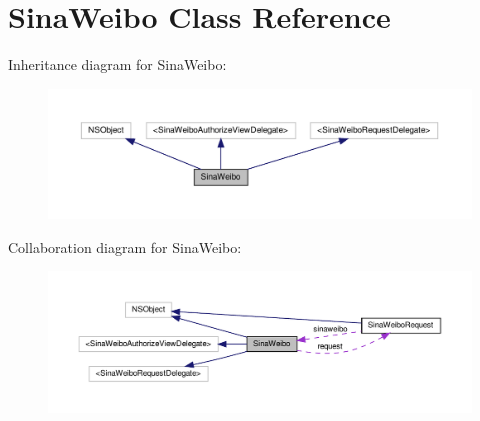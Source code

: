 \hypertarget{interfaceSinaWeibo}{}\section{Sina\+Weibo Class Reference}
\label{interfaceSinaWeibo}


Inheritance diagram for Sina\+Weibo\+:
\nopagebreak
\begin{figure}[H]
\begin{center}
\leavevmode
\includegraphics[width=350pt]{interfaceSinaWeibo__inherit__graph}
\end{center}
\end{figure}


Collaboration diagram for Sina\+Weibo\+:
\nopagebreak
\begin{figure}[H]
\begin{center}
\leavevmode
\includegraphics[width=350pt]{interfaceSinaWeibo__coll__graph}
\end{center}
\end{figure}
